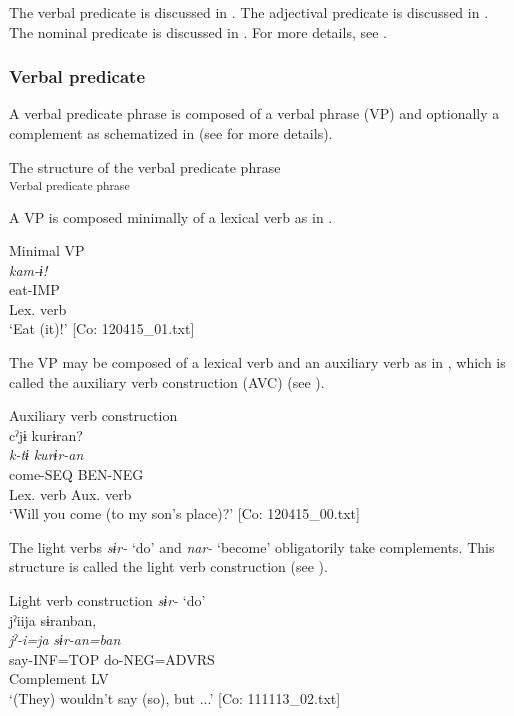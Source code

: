 The verbal predicate is discussed in . The adjectival predicate is discussed in . The nominal predicate is discussed in . For more details, see .

\subsubsection{Verbal predicate}\label{sec:4.1.3.1}

A verbal predicate phrase is composed of a verbal phrase (VP) and optionally a complement as schematized in  (see  for more details).

\ea\label{ex:4.5}  The structure of the verbal predicate phrase\\\textsubscript{Verbal predicate phrase}
\z

A VP is composed minimally of a lexical verb as in .

\ea\label{ex:4.6}  Minimal VP\\
    \glll \textit{kam-ɨ!}\\
    eat-IMP\\
    {Lex. verb}\\
    \glt     ‘Eat (it)!’   [Co: 120415\_01.txt]
\z

The VP may be composed of a lexical verb and an auxiliary verb as in , which is called the auxiliary verb construction (AVC) (see ).

\ea\label{ex:4.7}Auxiliary verb construction\\
    \gllll cˀjɨ  kurɨran?\\
    \textit{k-tɨ}  \textit{kurɨr-an}\\
    come-SEQ  BEN-NEG\\
    {Lex. verb}  {Aux. verb}\\
    \glt     ‘Will you come (to my son’s place)?’    [Co: 120415\_00.txt]
\z

The light verbs \textit{sɨr-} ‘do’ and \textit{nar-} ‘become’ obligatorily take complements. This structure is called the light verb construction (see ).

\ea  Light verb construction \label{ex:4.8}
 \ea  \textit{sɨr-} ‘do’\\
    \glll jˀiija  sɨranban,\\
    \textit{jˀ-i=ja}  \textit{sɨr{}-an=ban}\\
    say-INF=TOP  do-NEG=ADVRS\\
    Complement  LV\\
    \glt ‘(They) wouldn’t say (so), but ...’    [Co: 111113\_02.txt]

